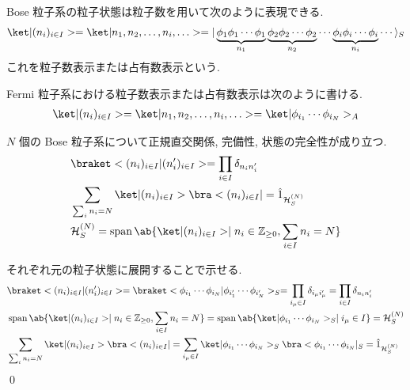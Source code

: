 \documentclass[uplatex,dvipdfmx,a4paper,11pt]{jlreq}
\makeatletter
\DeclareMathOperator{\Span}{span}
\newcommand{\ZZ}{\mathbb{Z}}
\newcommand{\HH}{\mathcal{H}}
\numberwithin{equation}{section}
\theoremstyle{definition}
\renewenvironment{proof}[1][\proofname]{\par
  \normalfont
  \topsep6\p@\@plus6\p@ \trivlist
  \item[\hskip\labelsep{\bfseries #1}\@addpunct{\bfseries}]\ignorespaces\quad\par
}{%
  \qed\endtrivlist\@endpefalse
}
\renewcommand\proofname{証明}
\makeatother
\begin{document}
\begin{definition}
  Bose 粒子系の粒子状態は粒子数を用いて次のように表現できる.
  \begin{align}
    \ket|(n_i)_{i\in I}> = \ket|n_1,n_2,\ldots,n_i,\ldots> = |\underbrace{\phi_1\phi_1\cdots\phi_1}_{n_1}\underbrace{\phi_2\phi_2\cdots\phi_2}_{n_2}\cdots\underbrace{\phi_i\phi_i\cdots\phi_i}_{n_i}\cdots\rangle_S
  \end{align}
  これを粒子数表示または占有数表示という.
\end{definition}
\begin{definition}
  Fermi 粒子系における粒子数表示または占有数表示は次のように書ける.
  \begin{align}
    \ket|(n_i)_{i\in I}> = \ket|n_1,n_2,\ldots,n_i,\ldots> = \ket|\phi_{i_1}\cdots\phi_{i_N}>_A
  \end{align}
\end{definition}
\begin{theorem}
  $N$ 個の Bose 粒子系について正規直交関係, 完備性, 状態の完全性が成り立つ.
  \begin{align}
     & \braket<(n_i)_{i\in I}|(n_i')_{i\in I}> = \prod_{i\in I}\delta_{n_in_i'}                      \\
     & \sum_{\sum_i n_i = N}\ket|(n_i)_{i\in I}>\bra<(n_i)_{i\in I}| = \hat{1}_{\HH_S^{(N)}}         \\
     & \HH_S^{(N)} = \Span\ab\{\ket|(n_i)_{i\in I}> \mid n_i\in\ZZ_{\geq 0}, \sum_{i\in I}n_i = N \}
  \end{align}
  \label{Bose N character}
\end{theorem}
\begin{proof}
  それぞれ元の粒子状態に展開することで示せる.
  \begin{align}
     & \braket<(n_i)_{i\in I}|(n_i')_{i\in I}> = \braket<\phi_{i_1}\cdots\phi_{i_N}|\phi_{i_1'}\cdots\phi_{i_N'}>_S = \prod_{i_\mu\in I}\delta_{i_\mu i_\mu'} = \prod_{i\in I}\delta_{n_in_i'} \\
     & \Span\ab\{\ket|(n_i)_{i\in I}> \mid n_i\in\ZZ_{\geq 0}, \sum_{i\in I}n_i = N \} = \Span\ab\{\ket|\phi_{i_1}\cdots\phi_{i_N}>_S \mid i_\mu\in I \} = \HH_S^{(N)}                         \\
     & \sum_{\sum_i n_i = N}\ket|(n_i)_{i\in I}>\bra<(n_i)_{i\in I}| = \sum_{i_\mu\in I}\ket|\phi_{i_1}\cdots\phi_{i_N}>_S\bra<\phi_{i_1}\cdots\phi_{i_N}|_S = \hat{1}_{\HH_S^{(N)}}
  \end{align}
\end{proof}
\end{document}
